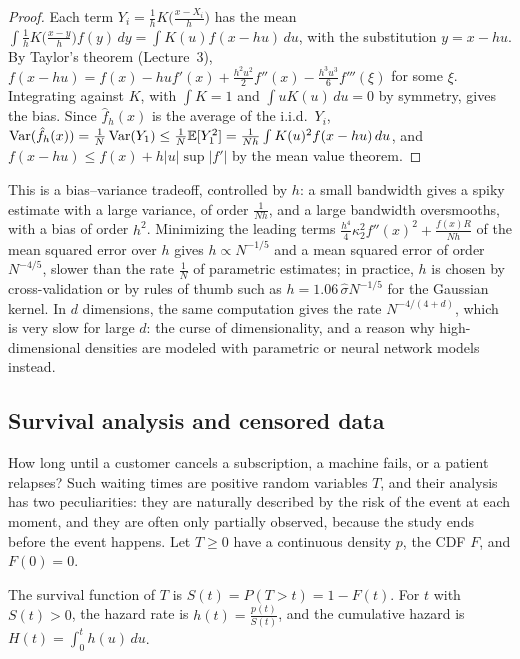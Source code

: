 \begin{proof}
    Each term $Y_i = \frac{1}{h}K\big(\frac{x - X_i}{h}\big)$ has the mean $\int \frac{1}{h}K\big(\frac{x - y}{h}\big)f(y)\, dy = \int K(u)f(x - hu)\, du$, with the substitution $y = x - hu$. By Taylor's theorem (Lecture~3), $f(x - hu) = f(x) - huf'(x) + \frac{h^2u^2}{2}f''(x) - \frac{h^3u^3}{6}f'''(\xi)$ for some $\xi$. Integrating against $K$, with $\int K = 1$ and $\int uK(u)\, du = 0$ by symmetry, gives the bias. Since $\hat f_h(x)$ is the average of the i.i.d.\ $Y_i$, $\operatorname{Var}(\hat f_h(x)) = \frac{1}{N}\operatorname{Var}(Y_1) \leq \frac{1}{N}\mathbb{E}[Y_1^2] = \frac{1}{Nh}\int K(u)^2f(x - hu)\, du$, and $f(x - hu) \leq f(x) + h|u|\sup|f'|$ by the mean value theorem.
\end{proof}

This is a bias--variance tradeoff, controlled by $h$: a small bandwidth gives a spiky estimate with a large variance, of order $\frac{1}{Nh}$, and a large bandwidth oversmooths, with a bias of order $h^2$. Minimizing the leading terms $\frac{h^4}{4}\kappa_2^2f''(x)^2 + \frac{f(x)R}{Nh}$ of the mean squared error over $h$ gives $h \propto N^{-1/5}$ and a mean squared error of order $N^{-4/5}$, slower than the rate $\frac{1}{N}$ of parametric estimates; in practice, $h$ is chosen by cross-validation or by rules of thumb such as $h = 1.06\,\hat\sigma N^{-1/5}$ for the Gaussian kernel. In $d$ dimensions, the same computation gives the rate $N^{-4/(4+d)}$, which is very slow for large $d$: the curse of dimensionality, and a reason why high-dimensional densities are modeled with parametric or neural network models instead.

\subsection{Survival analysis and censored data}\label{L4-sec:survival}

How long until a customer cancels a subscription, a machine fails, or a patient relapses? Such waiting times are positive random variables $T$, and their analysis has two peculiarities: they are naturally described by the risk of the event at each moment, and they are often only partially observed, because the study ends before the event happens. Let $T \geq 0$ have a continuous density $p$, the CDF $F$, and $F(0) = 0$.

\begin{definition}\label{L4-def:hazard}
    The survival function of $T$ is $S(t) = P(T > t) = 1 - F(t)$. For $t$ with $S(t) > 0$, the hazard rate is $h(t) = \frac{p(t)}{S(t)}$, and the cumulative hazard is $H(t) = \int_0^t h(u)\, du$.
\end{definition}

